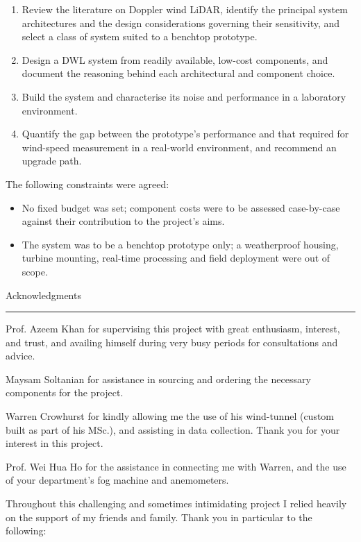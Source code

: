 \documentclass[a4paper,11pt]{report}
\begin{document}
\begin{enumerate}
	\item Review the literature on Doppler wind LiDAR, identify the principal
	system architectures and the design considerations governing their
	sensitivity, and select a class of system suited to a benchtop
	prototype.
	\item Design a DWL system from readily available, low-cost components, and
	document the reasoning behind each architectural and component choice.
	\item Build the system and characterise its noise and performance in a
	laboratory environment.
	\item Quantify the gap between the prototype's performance and that required
	for wind-speed measurement in a real-world environment, and recommend
	an upgrade path.
\end{enumerate}

The following constraints were agreed:

\begin{itemize}
	\item No fixed budget was set; component costs were to be assessed
	case-by-case against their contribution to the project's aims.
	\item The system was to be a benchtop prototype only; a weatherproof
	housing, turbine mounting, real-time processing and field deployment
	were out of scope.
\end{itemize}


\fancyfoot[C]{\thepage}
\pagestyle{plain}
\newpage
{}
{\Large Acknowledgments}\\
\hrule
Prof. Azeem Khan for supervising this project with great enthusiasm, interest, and trust, and availing himself during very busy periods for consultations and advice.

Maysam Soltanian for assistance in sourcing and ordering the necessary components for the project.

Warren Crowhurst for kindly allowing me the use of his wind-tunnel (custom built as part of his MSc.), and assisting in data collection. Thank you for your interest in this project. 

Prof. Wei Hua Ho for the assistance in connecting me with Warren, and the use of your department's fog machine and anemometers. 

Throughout this challenging and sometimes intimidating project I relied heavily on the support of my friends and family. Thank you in particular to the following:  
\end{document}
